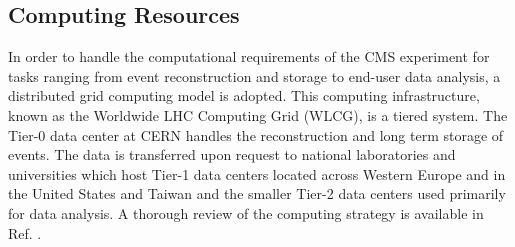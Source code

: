 \subsection{Computing Resources}

In order to handle the computational requirements of the CMS experiment for tasks ranging from event reconstruction and storage to end-user data analysis, a distributed grid computing model is adopted. This computing infrastructure, known as the Worldwide LHC Computing Grid (WLCG), is a tiered system. The Tier-0 data center at CERN handles the reconstruction and long term storage of events. The data is transferred upon request to national laboratories and universities which host Tier-1 data centers located across Western Europe and in the United States and Taiwan and the smaller Tier-2 data centers used primarily for data analysis. A thorough review of the computing strategy is available in Ref. \cite{CMSCOMPUTE}.
